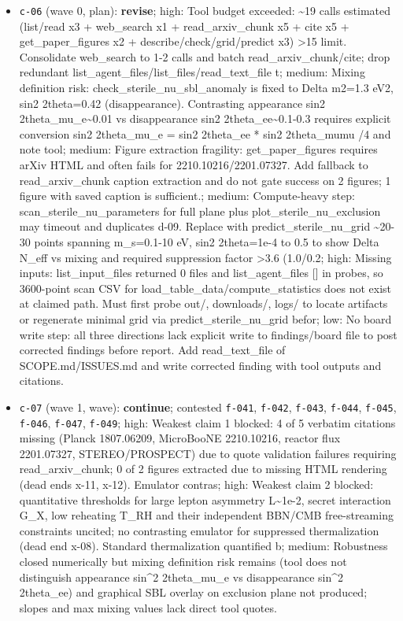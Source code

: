 \documentclass[11pt,a4paper]{article}
\begin{document}
\begin{itemize}
  \item \texttt{c-06} (wave 0, plan): \textbf{revise}; high: Tool budget exceeded: \textasciitilde{}19 calls estimated (list/read x3 + web\_search x1 + read\_arxiv\_chunk x5 + cite x5 + get\_paper\_figures x2 + describe/check/grid/predict x3) \textgreater{}15 limit. Consolidate web\_search to 1-2 calls and batch read\_arxiv\_chunk/cite; drop redundant list\_agent\_files/list\_files/read\_text\_file t; medium: Mixing definition risk: check\_sterile\_nu\_sbl\_anomaly is fixed to Delta m2=1.3 eV2, sin2 2theta=0.42 (disappearance). Contrasting appearance sin2 2theta\_mu\_e\textasciitilde{}0.01 vs disappearance sin2 2theta\_ee\textasciitilde{}0.1-0.3 requires explicit conversion sin2 2theta\_mu\_e = sin2 2theta\_ee * sin2 2theta\_mumu /4 and note tool; medium: Figure extraction fragility: get\_paper\_figures requires arXiv HTML and often fails for 2210.10216/2201.07327. Add fallback to read\_arxiv\_chunk caption extraction and do not gate success on 2 figures; 1 figure with saved caption is sufficient.; medium: Compute-heavy step: scan\_sterile\_nu\_parameters for full plane plus plot\_sterile\_nu\_exclusion may timeout and duplicates d-09. Replace with predict\_sterile\_nu\_grid \textasciitilde{}20-30 points spanning m\_s=0.1-10 eV, sin2 2theta=1e-4 to 0.5 to show Delta N\_eff vs mixing and required suppression factor \textgreater{}3.6 (1.0/0.2; high: Missing inputs: list\_input\_files returned 0 files and list\_agent\_files [] in probes, so 3600-point scan CSV for load\_table\_data/compute\_statistics does not exist at claimed path. Must first probe out/, downloads/, logs/ to locate artifacts or regenerate minimal grid via predict\_sterile\_nu\_grid befor; low: No board write step: all three directions lack explicit write to findings/board file to post corrected findings before report. Add read\_text\_file of SCOPE.md/ISSUES.md and write corrected finding with tool outputs and citations.
  \item \texttt{c-07} (wave 1, wave): \textbf{continue}; contested \texttt{f-041}, \texttt{f-042}, \texttt{f-043}, \texttt{f-044}, \texttt{f-045}, \texttt{f-046}, \texttt{f-047}, \texttt{f-049}; high: Weakest claim 1 blocked: 4 of 5 verbatim citations missing (Planck 1807.06209, MicroBooNE 2210.10216, reactor flux 2201.07327, STEREO/PROSPECT) due to quote validation failures requiring read\_arxiv\_chunk; 0 of 2 figures extracted due to missing HTML rendering (dead ends x-11, x-12). Emulator contras; high: Weakest claim 2 blocked: quantitative thresholds for large lepton asymmetry L\textasciitilde{}1e-2, secret interaction G\_X, low reheating T\_RH and their independent BBN/CMB free-streaming constraints uncited; no contrasting emulator for suppressed thermalization (dead end x-08). Standard thermalization quantified b; medium: Robustness closed numerically but mixing definition risk remains (tool does not distinguish appearance sin\textasciicircum{}2 2theta\_mu\_e vs disappearance sin\textasciicircum{}2 2theta\_ee) and graphical SBL overlay on exclusion plane not produced; slopes and max mixing values lack direct tool quotes.

\end{itemize}
\end{document}
